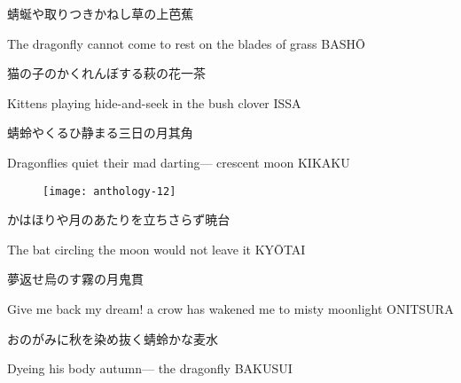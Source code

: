 \begin{haiku}
    {\FH 蜻蜒や取りつきかねし草の上}\hfill{\FH 芭蕉}

    \vin{} The dragonfly
    \vin{} \vin{} cannot come to rest
    \vin{} \vin{} \vin{} on the blades of grass \hspace{\fill} BASH\={O}
\end{haiku}

\begin{haiku}
    {\FH 猫の子のかくれんぼする萩の花}\hfill{\FH 一茶}

    \vin{} Kittens
    \vin{} \vin{} playing hide-and-seek
    \vin{} \vin{} \vin{} in the bush clover \hspace{\fill} ISSA
\end{haiku}

\begin{haiku}
    {\FH 蜻蛉やくるひ静まる三日の月}\hfill{\FH 其角}

    \vin{} Dragonflies
    \vin{} \vin{} quiet their mad darting---
    \vin{} \vin{} \vin{} crescent moon \hspace{\fill} KIKAKU
\end{haiku}

\begin{figure}
    \texttt{[image: anthology-12]}
\end{figure}

\begin{haiku}
    {\FH かはほりや月のあたりを立ちさらず}\hfill{\FH 暁台}

    \vin{} The bat
    \vin{} \vin{} circling the moon
    \vin{} \vin{} \vin{} would not leave it \hspace{\fill} KY\={O}TAI
\end{haiku}

\begin{haiku}
    {\FH 夢返せ烏のす霧の月}\hfill{\FH 鬼貫}

    \vin{} Give me back my dream!
    \vin{} \vin{} a crow has wakened me
    \vin{} \vin{} \vin{} to misty moonlight \hspace{\fill} ONITSURA
\end{haiku}

\begin{haiku}
    {\FH おのがみに秋を染め抜く蜻蛉かな}\hfill{\FH 麦水}

    \vin{} Dyeing his body
    \vin{} \vin{} autumn---
    \vin{} \vin{} \vin{} the dragonfly \hspace{\fill} BAKUSUI
\end{haiku}

